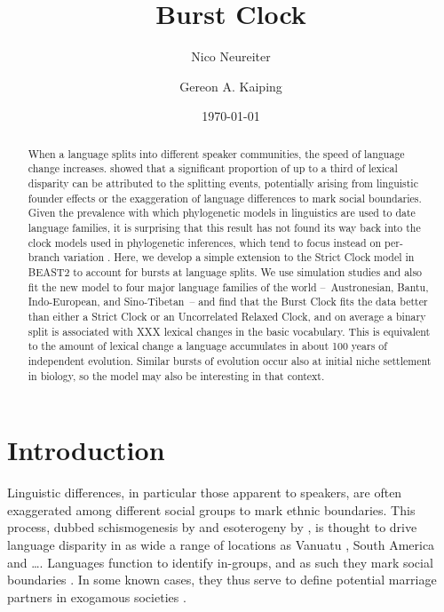 \documentclass[a4paper,12pt]{scrartcl}
\title{Burst Clock}
\date{\today}
\author[1]{Nico Neureiter}
\author[1]{Gereon A. Kaiping}
\affil[1]{Geographic Information Science Center, Universität Zürich, CH}
\begin{document}
\maketitle
\begin{abstract}
When a language splits into different speaker communities, the speed of
language change increases. \Textcite{atkinson2008languages} showed that a
significant proportion of up to a third of lexical disparity can be attributed
to the splitting events, potentially arising from linguistic founder effects or
the exaggeration of language differences to mark social boundaries. Given the
prevalence with which phylogenetic models in linguistics are used to date
language families, it is surprising that this result has not found its way back
into the clock models used in phylogenetic inferences, which tend to focus
instead on per-branch variation \parencite{}. Here, we develop a simple
extension to the Strict Clock model \parencite{} in BEAST2 \parencite{} to
account for bursts at language splits. We use simulation studies and also fit
the new model to four major language families of the world –~Austronesian,
Bantu, Indo-European, and Sino-Tibetan~– and find that the Burst Clock fits the
data better than either a Strict Clock or an Uncorrelated Relaxed Clock, and on
average a binary split is associated with XXX lexical changes in the basic
vocabulary. This is equivalent to the amount of lexical change a language
accumulates in about 100 years of independent evolution. Similar bursts of evolution
occur also at initial niche settlement in biology, so the model may also be
interesting in that context.
\end{abstract}

\section{Introduction}

Linguistic differences, in particular those apparent to speakers, are often
exaggerated among different social groups to mark ethnic boundaries. This
process, dubbed schismogenesis by \textcite{bateson1935culture} and esoterogeny
by \textcite{thurston1987processes}, is thought to drive language disparity in
as wide a range of locations as Vanuatu \parencite{}, South America \parencite{}
and …. Languages function to identify in-groups, and as such they mark social
boundaries \parencite{labov1963social}. In some known cases, they thus serve to
define potential marriage partners in exogamous societies \parencite{}.
\end{document}
